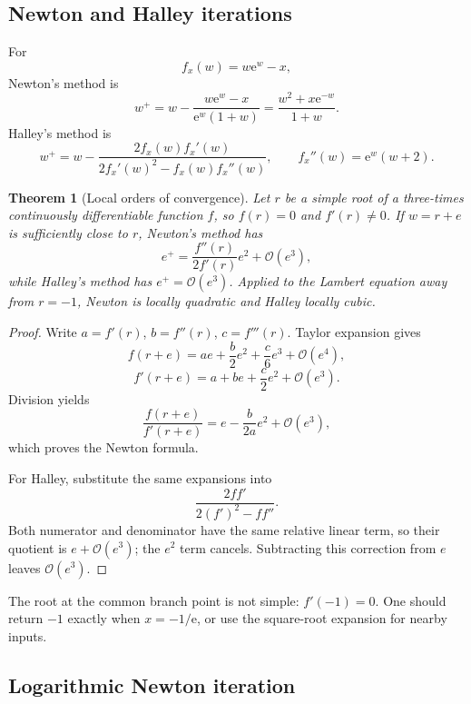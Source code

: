 \documentclass[11pt]{article}
\newtheorem{theorem}{Theorem}[section]
\theoremstyle{remark}
\newcommand{\ee}{\mathrm e}
\newcommand{\bigO}{\mathcal O}
\begin{document}
\subsection{Newton and Halley iterations}

For
\[
       f_x(w)=w\ee^w-x,
\]
Newton's method is
\begin{equation}\label{eq:newton-original}
 w^+
 =w-\frac{w\ee^w-x}{\ee^w(1+w)}
 =\frac{w^2+x\ee^{-w}}{1+w}.
\end{equation}
Halley's method is
\begin{equation}\label{eq:halley}
 w^+
 =w-\frac{2f_x(w)f_x'(w)}
          {2f_x'(w)^2-f_x(w)f_x''(w)},
 \qquad
 f_x''(w)=\ee^w(w+2).
\end{equation}

\begin{theorem}[Local orders of convergence]\label{thm:newton-halley-orders}
Let \(r\) be a simple root of a three-times continuously differentiable
function \(f\), so \(f(r)=0\) and \(f'(r)\neq0\).  If \(w=r+e\) is
sufficiently close to \(r\), Newton's method has
\[
       e^+=\frac{f''(r)}{2f'(r)}e^2+\bigO(e^3),
\]
while Halley's method has \(e^+=\bigO(e^3)\).  Applied to the Lambert
equation away from \(r=-1\), Newton is locally quadratic and Halley locally
cubic.
\end{theorem}

\begin{proof}
Write \(a=f'(r)\), \(b=f''(r)\), \(c=f'''(r)\).  Taylor expansion gives
\[
 f(r+e)=ae+\frac b2e^2+\frac c6e^3+\bigO(e^4),
\]
\[
 f'(r+e)=a+be+\frac c2e^2+\bigO(e^3).
\]
Division yields
\[
       \frac{f(r+e)}{f'(r+e)}
       =e-\frac{b}{2a}e^2+\bigO(e^3),
\]
which proves the Newton formula.

For Halley, substitute the same expansions into
\[
       \frac{2ff'}{2(f')^2-ff''}.
\]
Both numerator and denominator have the same relative linear term, so their
quotient is \(e+\bigO(e^3)\); the \(e^2\) term cancels.  Subtracting this
correction from \(e\) leaves \(\bigO(e^3)\).
\end{proof}

The root at the common branch point is not simple:
\(f'(-1)=0\).  One should return \(-1\) exactly when \(x=-1/\ee\), or use
the square-root expansion for nearby inputs.

\subsection{Logarithmic Newton iteration}
\end{document}
